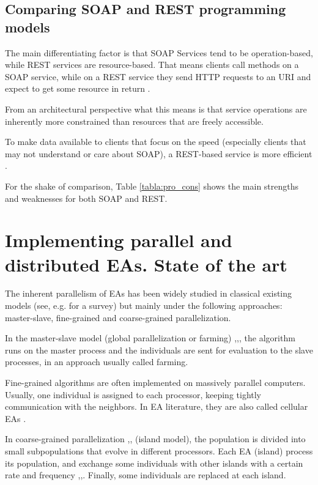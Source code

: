 \documentclass[final,1p,times]{elsarticle}
\begin{document}
\subsection{Comparing SOAP and REST programming models}
\label{sec:progmodels}

The main differentiating factor is that SOAP Services tend to be operation-based, while REST services are resource-based.
That means clients call methods on a SOAP service, while on a REST service they send HTTP requests to an URI and expect to get some resource in return \cite{Daigneau2011}.

From an architectural perspective what this means is that service operations are inherently more constrained than resources that are freely accessible.

To make data available to clients that focus on the speed (especially clients that may not understand or care about SOAP), a REST-based service is more efficient \cite{Daigneau2011}.

For the shake of comparison, Table \ref{tabla:pro_cons} shows the main strengths and weaknesses for both SOAP and REST.


\section{Implementing parallel and distributed EAs. State of the art}
\label{sec:soa}

The inherent parallelism of EAs \cite{EibenSmith2003} has been widely studied in classical existing models (see, e.g. \cite{CantuPaz2000} for a survey) but mainly under the following approaches: master-slave, fine-grained and coarse-grained parallelization. 

In the master-slave model (global parallelization or farming) \cite{FogartyHuang},\cite{AbramsonAbela},\cite{HauserManner}, the algorithm runs on the master process and the individuals are sent for evaluation to the slave processes, in an approach usually called farming. 

Fine-grained algorithms are often implemented on massively parallel computers. Usually, one individual is assigned to each processor, keeping tightly communication with the neighbors. 
In EA literature, they are also called cellular EAs \cite{Cantor2010}.

In coarse-grained parallelization \cite{Tanese},\cite{Pettey},\cite{CantuPazGoldberg} (island model), the population is divided into small subpopulations that evolve in different processors. 
Each EA (island) process its population, and exchange some individuals with other islands with a certain rate and frequency \cite{CantuPaz1999},\cite{alba2000},\cite{salto2012}. 
Finally, some individuals are replaced at each island.
\end{document}

